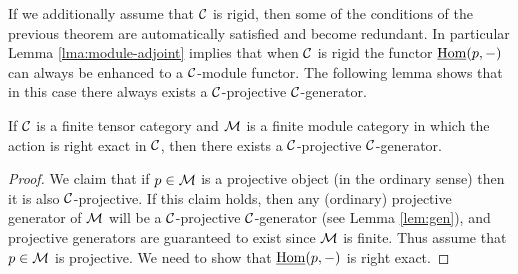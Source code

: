\documentclass{amsart}
\begin{document}
If we additionally assume that $\mathcal C$ is rigid, then some of the conditions of the previous theorem are automatically satisfied and become redundant. In particular Lemma \ref{lma:module-adjoint} implies that when $\mathcal C$ is rigid the functor $\operatorname{\underline{Hom}}(p,-)$ can always be enhanced to a $\mathcal C$-module functor.  The following lemma shows that in this case there always exists a $\mathcal C$-projective $\mathcal C$-generator.  
\begin{lemma}{\cite[\S 2.11]{EGNO}} \label{lma:Enough_C-projs}
	If $\mathcal C$ is a finite tensor category and $\mathcal M$ is a finite module category in which the action is right exact in $\mathcal C$, then there exists a $\mathcal C$-projective $\mathcal C$-generator.   
\end{lemma}   
\begin{proof}
	We claim that if $p \in \mathcal M$ is a projective object (in the ordinary sense) then it is also $\mathcal C$-projective. If this claim holds, then any (ordinary) projective generator of $\mathcal M$ will be a $\mathcal C$-projective $\mathcal C$-generator (see Lemma \ref{lem:gen}), and projective generators are guaranteed to exist since $\mathcal M$ is finite.  
	Thus assume that $p \in \mathcal M$ is projective.  We need to show that $\operatorname{\underline{Hom}}(p, -)$ is right exact. 
	

\end{proof}
\end{document}
